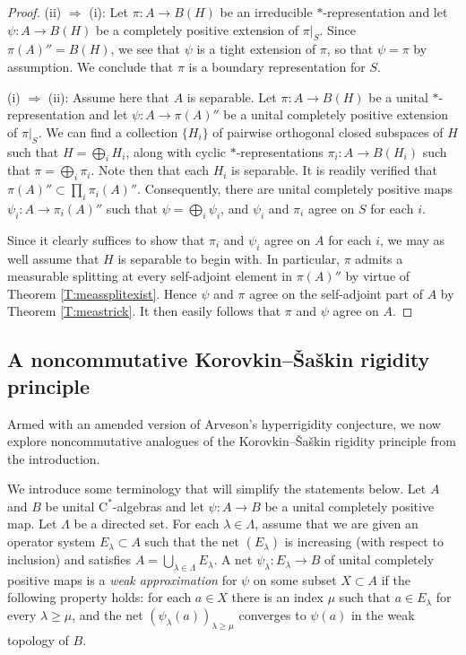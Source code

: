 \documentclass[10pt]{amsart}
\newcommand{\rC}{\mathrm{C}}
\theoremstyle{definition}
\begin{document}
\begin{proof}
(ii) $\Rightarrow$ (i): Let $\pi:A\to B(H)$ be an irreducible $*$-representation and let $\psi:A\to B(H)$ be a completely positive extension of $\pi|_S$. Since $\pi(A)''=B(H)$, we see that $\psi$ is a tight extension of $\pi$, so that $\psi=\pi$ by assumption. We conclude that $\pi$ is a boundary representation for $S$.

(i) $\Rightarrow$ (ii):  Assume here that $A$ is separable. Let $\pi:A\to B(H)$ be a unital $*$-representation and let $\psi:A\to \pi(A)''$ be a unital completely positive extension of $\pi|_S$. We can find a collection $\{H_i\}$ of pairwise orthogonal closed subspaces of $H$ such that $H=\bigoplus_i H_i$, along with cyclic $*$-representations $\pi_i:A\to B(H_i)$ such that $\pi=\bigoplus_{i} \pi_i$. Note then that each $H_i$ is separable.  It is readily verified that $\pi(A)''\subset \prod_i \pi_i(A)''$. Consequently, there are unital completely positive maps $\psi_i:A\to \pi_i(A)''$ such that $\psi=\bigoplus_i \psi_i$, and $\psi_i$ and $\pi_i$ agree on $S$ for each $i$.

Since it clearly suffices to show that $\pi_i$ and $\psi_i$ agree on $A$ for each $i$, we may as well assume that $H$ is separable to begin with. In particular, $\pi$ admits a measurable splitting at every self-adjoint element in $\pi(A)''$ by virtue of Theorem \ref{T:meassplitexist}.  
Hence $\psi$ and $\pi$ agree on the self-adjoint part of $A$  by Theorem \ref{T:meastrick}. It then easily follows that $\pi$ and $\psi$ agree on $A$.
\end{proof}




\subsection{A noncommutative Korovkin--\v Sa\v skin rigidity principle}\label{SS:ncKS}

Armed with an amended version of Arveson's hyperrigidity conjecture, we now explore  noncommutative analogues  of the Korovkin--\v Sa\v skin rigidity principle from the introduction. 

We introduce some terminology that will simplify the statements below.
Let $A$ and $B$ be unital $\rC^*$-algebras and let $\psi:A\to B$ be a unital completely positive map. Let $\Lambda$ be a directed set. For each $\lambda\in \Lambda$, assume that we are given an operator system $E_\lambda\subset A$ such that the net $(E_\lambda)$ is increasing (with respect to inclusion) and satisfies $A=\bigcup_{\lambda\in \Lambda}E_\lambda$. A net $\psi_\lambda:E_\lambda\to B$ of unital completely positive maps is a \emph{weak approximation} for $\psi$ on  some subset $X\subset A$ if the following property holds: for each $a\in X$ there is an index $\mu$ such that $a\in E_{\lambda}$ for every $\lambda\geq \mu$, and the net $(\psi_\lambda(a))_{\lambda\geq \mu}$ converges to $\psi(a)$ in the weak topology of $B$. 
\end{document}
